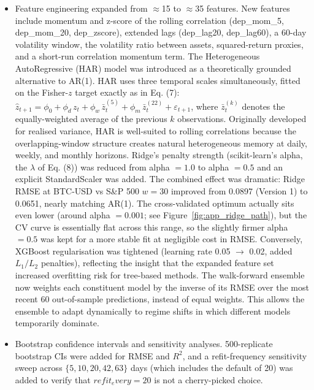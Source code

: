 \begin{itemize}
\item Feature engineering expanded from $\approx$15 to $\approx$35 features. New features include momentum and z-score of the rolling correlation (dep\_mom\_5, dep\_mom\_20, dep\_zscore), extended lags (dep\_lag20, dep\_lag60), a 60-day volatility window, the volatility ratio between assets, squared-return proxies, and a short-run correlation momentum term. The Heterogeneous AutoRegressive (HAR) model \cite{corsi2009har} was introduced as a theoretically grounded alternative to AR(1). HAR uses three temporal scales simultaneously, fitted on the Fisher-$z$ target exactly as in Eq. (7): $\hat{z}_{t+1} = \phi_0 + \phi_d\,z_t + \phi_w\,\bar{z}^{(5)}_t + \phi_m\,\bar{z}^{(22)}_t + \varepsilon_{t+1}$, where $\bar{z}^{(k)}_t$ denotes the equally-weighted average of the previous $k$ observations. Originally developed for realised variance, HAR is well-suited to rolling correlations because the overlapping-window structure creates natural heterogeneous memory at daily, weekly, and monthly horizons. Ridge's penalty strength (scikit-learn's alpha, the $\lambda$ of Eq. (8)) was reduced from alpha $= 1.0$ to alpha $= 0.5$ and an explicit StandardScaler was added. The combined effect was dramatic: Ridge RMSE at BTC-USD vs S\&P 500 $w = 30$ improved from 0.0897 (Version 1) to 0.0651, nearly matching AR(1). The cross-validated optimum actually sits even lower (around alpha $= 0.001$; see Figure~\ref{fig:app_ridge_path}), but the CV curve is essentially flat across this range, so the slightly firmer alpha $= 0.5$ was kept for a more stable fit at negligible cost in RMSE. Conversely, XGBoost regularisation was tightened (learning rate 0.05 $\to$ 0.02, added $L_1/L_2$ penalties), reflecting the insight that the expanded feature set increased overfitting risk for tree-based methods. The walk-forward ensemble now weights each constituent model by the inverse of its RMSE over the most recent 60 out-of-sample predictions, instead of equal weights. This allows the ensemble to adapt dynamically to regime shifts in which different models temporarily dominate.
    \item Bootstrap confidence intervals and sensitivity analyses. 500-replicate bootstrap CIs were added for RMSE and $R^2$, and a refit-frequency sensitivity sweep across $\{5, 10, 20, 42, 63\}$ days (which includes the default of 20) was added to verify that $refit_every = 20$ is not a cherry-picked choice.
\end{itemize}

